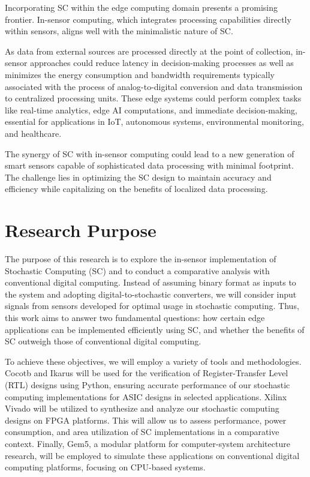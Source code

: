 Incorporating SC within the edge computing domain presents a
promising frontier. In-sensor computing, which integrates processing
capabilities directly within sensors, aligns well with the
minimalistic nature of SC. 

As data from external sources are processed directly
at the point of collection, in-sensor approaches could reduce latency in decision-making
processes as well as minimizes the energy consumption and bandwidth requirements
typically associated with the process of analog-to-digital conversion and data transmission to centralized processing units.
These edge systems could perform complex tasks like real-time analytics, edge AI
computations, and immediate decision-making, essential for applications in IoT,
autonomous systems, environmental monitoring, and healthcare. 

The synergy of SC with in-sensor computing could lead to a new generation of smart sensors capable of sophisticated data processing with minimal footprint. The challenge lies
in optimizing the SC design to maintain accuracy and efficiency while
capitalizing on the benefits of localized data processing.


\section{Research Purpose}
\label{sec:intro:motivation}

The purpose of this research is to explore the in-sensor implementation of Stochastic Computing (SC) and to conduct a comparative analysis with conventional digital computing. Instead of assuming binary format as inputs to the system and adopting digital-to-stochastic converters, we will consider input signals from sensors developed for optimal usage in stochastic computing. Thus, this work aims to answer two fundamental questions: how certain edge applications can be implemented efficiently using SC, and whether the benefits of SC outweigh those of conventional digital computing.

To achieve these objectives, we will employ a variety of tools and methodologies. Cocotb and Ikarus will be used for the verification of Register-Transfer Level (RTL) designs using Python, ensuring accurate performance of our stochastic computing implementations for ASIC designs in selected applications. Xilinx Vivado will be utilized to synthesize and analyze our stochastic computing designs on FPGA platforms. This will allow us to assess performance, power consumption, and area utilization of SC implementations in a comparative context. Finally, Gem5, a modular platform for computer-system architecture research, will be employed to simulate these applications on conventional digital computing platforms, focusing on CPU-based systems.

